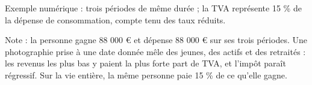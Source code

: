 Exemple numérique : trois périodes de même durée ; la TVA représente 15 \% de la dépense de consommation, compte tenu des taux réduits.\par Note : la personne gagne 88 000 \euro{} et dépense 88 000 \euro{} sur ses trois périodes. Une photographie prise à une date donnée mêle des jeunes, des actifs et des retraités : les revenus les plus bas y paient la plus forte part de TVA, et l'impôt paraît régressif. Sur la vie entière, la même personne paie 15 \% de ce qu'elle gagne.
